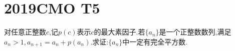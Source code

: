 \documentclass[]{article}
\title{}
\author{}
\date{}
\begin{document}
\maketitle
\section{2019CMO T5}{
对任意正整数$c$,记$p(c)$表示$c$的最大素因子.若$\{ a_n \}$是一个正整数数列,满足$a_n>1,a_{n+1}=a_n+p(a_n)$.求证:$\{ a_n \}$中一定有完全平方数.
}
\end{document}
